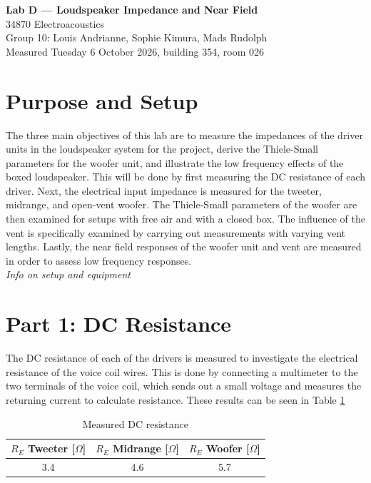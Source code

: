 \documentclass[a4paper,10pt]{article}
\begin{document}
\begin{center}
{\Large\bfseries Lab D --- Loudspeaker Impedance and Near Field}\\[5pt]
34870 Electroacoustics\\[4pt]
Group 10: Louis Andrianne, Sophie Kimura, Mads Rudolph\\[4pt]
Measured Tuesday 6 October 2026, building 354, room 026
\end{center}
\thispagestyle{fancy}

\section{Purpose and Setup}

The three main objectives of this lab are to measure the impedances of the driver units in the loudspeaker system for the project, derive the Thiele-Small parameters for the woofer unit, and illustrate the low frequency effects of the boxed loudspeaker. This will be done by first measuring the DC resistance of each driver. Next, the electrical input impedance is measured for the tweeter, midrange, and open-vent woofer. The Thiele-Small parameters of the woofer are then examined for setups with free air and with a closed box. The influence of the vent is specifically examined by carrying out measurements with varying vent lengths. Lastly, the near field responses of the woofer unit and vent are measured in order to assess low frequency responses.\\

\textit{Info on setup and equipment}


\section{Part 1: DC Resistance}
The DC resistance of each of the drivers is measured to investigate the electrical resistance of the voice coil wires. This is done by connecting a multimeter to the two terminals of the voice coil, which sends out a small voltage and measures the returning current to calculate resistance. These results can be seen in Table \ref{tab:DC}\\



\begin{table}[H]
    \centering
    \begin{tabular}{c|c|c}
        $R_E$ Tweeter [$\Omega$]& $R_E$ Midrange [$\Omega$]& $R_E$ Woofer [$\Omega$] \\
        \hline
        3.4  & 4.6 & 5.7\\
    \end{tabular}
    \caption{Measured DC resistance}
    \label{tab:DC}
\end{table}
\end{document}
